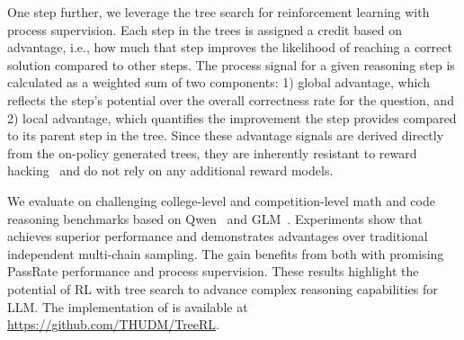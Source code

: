 One step further, we leverage the tree search for reinforcement learning with process supervision. Each step in the trees is assigned a credit based on advantage, i.e., how much that step improves the likelihood of reaching a correct solution compared to other steps. The process signal for a given reasoning step is calculated as a weighted sum of two components: 1) global advantage, which reflects the step's potential over the overall correctness rate 
for the question, and 2) local advantage, which quantifies the improvement the step provides compared to its parent step in the tree. Since these advantage signals are derived directly from the on-policy generated trees, they are inherently resistant to reward hacking~\citep{skalse2022defining} and do not rely on any additional reward models.



We evaluate \model on challenging college-level and competition-level math and code reasoning benchmarks based on Qwen~\citep{qwen2_5} and GLM~\citep{glm2024chatglm}. Experiments show that \model achieves superior performance and demonstrates advantages over traditional independent multi-chain sampling. The gain benefits from both \treemodel with promising PassRate performance and process supervision. These results highlight the potential of RL with tree search to advance complex reasoning capabilities for LLM. The implementation of \model is available at \url{https://github.com/THUDM/TreeRL}. 



















